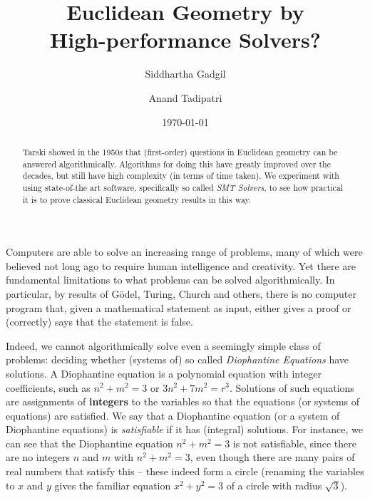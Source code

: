 \documentclass{amsart}
\theoremstyle{plain}
\theoremstyle{definition}
\theoremstyle{remark}
\begin{document}
\title[Euclidean Geometry by High-performance Solvers?]{Euclidean Geometry by\\ High-performance Solvers?}
\date{\today}
\author{Siddhartha Gadgil}

\address{Department of Mathematics\\
	Indian Institute of Science\\
	Bangalore.}

\author{Anand Tadipatri}
\address{Indian Institute of Science Education and Research\\
	Pune.}

\begin{abstract}
	Tarski showed in the 1950s that (first-order) questions in Euclidean geometry can be answered algorithmically. 
	Algorithms for doing this have greatly improved over the decades, but still have high complexity (in terms of time taken). 
	We experiment with using state-of-the art software, specifically so called \emph{SMT Solvers}, to see how practical it is 
	to prove classical Euclidean geometry results in this way. 
\end{abstract}

\maketitle

Computers are able to solve an increasing range of problems, many of
which were believed not long ago to require human intelligence and creativity. Yet
there are fundamental limitations to what problems can be solved
algorithmically. In particular, by
results of G\"odel, Turing, Church and others, there is no computer
program that, given a mathematical statement as input, either gives a
proof or (correctly) says that the statement is false.

Indeed, we cannot algorithmically solve even a seemingly simple class of
problems: deciding whether (systems of) so called
\emph{Diophantine Equations} have solutions. A Diophantine equation is a polynomial
equation with integer coefficients, such as $n^2 + m^2 = 3$ or \(3n^2 + 7m^2 = r^3\).
Solutions of such equations are assignments of \textbf{integers} to the variables so that
the equations (or systems of equations) are satisfied.
We say that a Diophantine equation (or a system of Diophantine equations) is \emph{satisfiable}
if it has (integral) solutions.
For
instance, we can see that the Diophantine equation \(n^2 + m^2 = 3\) is not satisfiable,
since there are no integers $n$ and $m$ with \(n^2 + m^2 = 3\), even though there
are many pairs of real numbers that satisfy this -- these indeed form a circle (renaming the variables
to $x$ and $y$ gives the familiar equation $x^2+ y^2 =3$ of a circle with radius $\sqrt{3}$).
\end{document}
